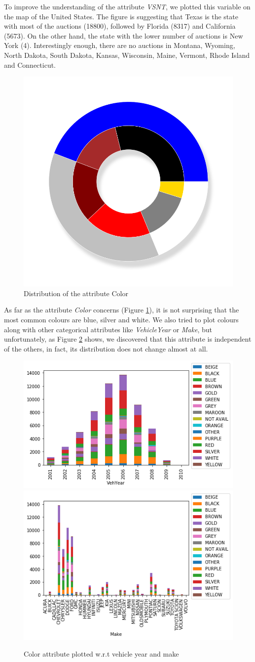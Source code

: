 \documentclass{article}
\begin{document}
	To improve the understanding of the attribute \emph{VSNT}, we plotted this variable on the map of the United States. The figure is suggesting that Texas is the state with most of the auctions (18800), followed by Florida (8317) and California (5673). On the other hand, the state with the lower number of auctions is New York (4). Interestingly enough, there are no auctions in Montana, Wyoming, North Dakota, South Dakota, Kansas, Wisconsin, Maine, Vermont, Rhode Island and Connecticut.
	
	\begin{figure}[H]
		\centering
		\includegraphics[width=.3\textwidth]{color.png}
		\caption{Distribution of the attribute Color}
		\label{fig:color}
	\end{figure}
	
	
	As far as the attribute \emph{Color} concerns (Figure \ref{fig:color}), it is not surprising that the most common colours are blue, silver and white. We also tried to plot colours along with other categorical attributes like \emph{VehicleYear} or \emph{Make}, but unfortunately, as Figure \ref{fig:colorwrt} shows, we discovered that this attribute is independent of the others, in fact, its distribution does not change almost at all.
	
	
	\begin{figure}[]
		\centering
		\includegraphics[width=.5\textwidth, keepaspectratio]{barcoloryear.png}\hspace{1cm}
		\includegraphics[width=.42\textwidth, keepaspectratio]{barcolormake.png}
		\caption{Color attribute plotted w.r.t vehicle year and make}
		\label{fig:colorwrt}
	\end{figure}
	
\end{document}
